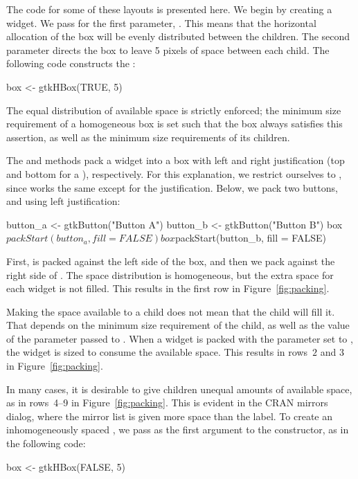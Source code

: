 \documentclass[article,shortnames]{jss}
\begin{document}
The code for some of these layouts is presented here. We begin by
creating a  widget. We pass  for the
first parameter, . This means that the horizontal
allocation of the box will be evenly distributed between the children. 
The second parameter directs the box to leave 5 pixels of space
between each child.  The following code constructs the :
\begin{Code}
box <- gtkHBox(TRUE, 5)
\end{Code}
The equal distribution of available space is strictly enforced; the
minimum size requirement of a homogeneous box is set such that the box
always satisfies this assertion, as well as the minimum size
requirements of its children.

The  and  methods pack a
widget into a box with left and right justification (top and
bottom for a ), respectively. For this explanation, we
restrict ourselves to , since
 works the same except for the
justification. Below, we pack two buttons,  and
 using left justification:
\begin{Code}
button_a <- gtkButton("Button A")
button_b <- gtkButton("Button B")
box$packStart(button_a, fill = FALSE)
box$packStart(button_b, fill = FALSE)
\end{Code}
First,  is packed against the left side of the box,
and then we pack  against the right side of
.
The space distribution is homogeneous, but
the extra space for each widget is not filled. This results in the
first row in Figure~\ref{fig:packing}.

Making the space available to a child does not mean that the
child will fill it. That depends on the minimum size requirement of
the child, as well as the value of the  parameter passed to
. When a widget is packed with the 
parameter set to , the widget is sized to consume the
available space. This results in rows~$2$ and $3$ in Figure~\ref{fig:packing}.


In many cases, it is desirable to give children unequal amounts of
available space, as in rows~4--9 in Figure~\ref{fig:packing}. This is
evident in the CRAN mirrors dialog, where the mirror list is given
more space than the  label. To create an
inhomogeneously spaced , we pass
 as the first argument to the constructor, as in the
following code:
\begin{Code}
box <- gtkHBox(FALSE, 5)
\end{Code}
\end{document}
